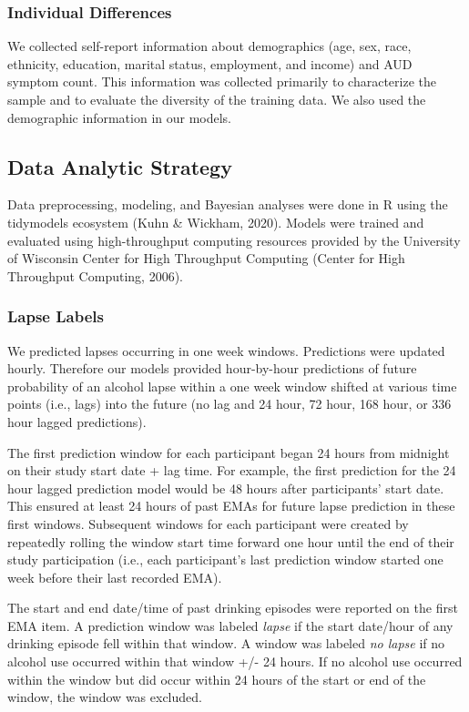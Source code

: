 \documentclass[
]{agujournal2019}
\begin{document}
\subsubsection{Individual Differences}\label{individual-differences}

We collected self-report information about demographics (age, sex, race,
ethnicity, education, marital status, employment, and income) and AUD
symptom count. This information was collected primarily to characterize
the sample and to evaluate the diversity of the training data. We also
used the demographic information in our models.

\subsection{Data Analytic Strategy}\label{data-analytic-strategy}

Data preprocessing, modeling, and Bayesian analyses were done in R using
the tidymodels ecosystem (Kuhn \& Wickham, 2020). Models were trained
and evaluated using high-throughput computing resources provided by the
University of Wisconsin Center for High Throughput Computing (Center for
High Throughput Computing, 2006).

\subsubsection{Lapse Labels}\label{lapse-labels}

We predicted lapses occurring in one week windows. Predictions were
updated hourly. Therefore our models provided hour-by-hour predictions
of future probability of an alcohol lapse within a one week window
shifted at various time points (i.e., lags) into the future (no lag and
24 hour, 72 hour, 168 hour, or 336 hour lagged predictions).

The first prediction window for each participant began 24 hours from
midnight on their study start date + lag time. For example, the first
prediction for the 24 hour lagged prediction model would be 48 hours
after participants' start date. This ensured at least 24 hours of past
EMAs for future lapse prediction in these first windows. Subsequent
windows for each participant were created by repeatedly rolling the
window start time forward one hour until the end of their study
participation (i.e., each participant's last prediction window started
one week before their last recorded EMA).

The start and end date/time of past drinking episodes were reported on
the first EMA item. A prediction window was labeled \emph{lapse} if the
start date/hour of any drinking episode fell within that window. A
window was labeled \emph{no lapse} if no alcohol use occurred within
that window +/- 24 hours. If no alcohol use occurred within the window
but did occur within 24 hours of the start or end of the window, the
window was excluded.
\end{document}
